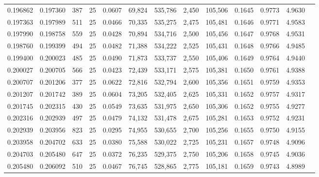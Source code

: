 \begin{tabular}{rrrrrrrrrrrrr}
0.196862 & 0.197360 &   387 &  25 &                                     0.0607 &  69,824 & 535,786 &   2,450 & 105,506 & 0.1645 & 0.9773 & 4.9630 \\
0.197363 & 0.197989 &   511 &  25 &                                     0.0466 &  70,335 & 535,275 &   2,475 & 105,481 & 0.1646 & 0.9771 & 4.9583 \\
0.197990 & 0.198758 &   559 &  25 &                                     0.0428 &  70,894 & 534,716 &   2,500 & 105,456 & 0.1647 & 0.9768 & 4.9531 \\
0.198760 & 0.199399 &   494 &  25 &                                     0.0482 &  71,388 & 534,222 &   2,525 & 105,431 & 0.1648 & 0.9766 & 4.9485 \\
0.199400 & 0.200023 &   485 &  25 &                                     0.0490 &  71,873 & 533,737 &   2,550 & 105,406 & 0.1649 & 0.9764 & 4.9440 \\
0.200027 & 0.200705 &   566 &  25 &                                     0.0423 &  72,439 & 533,171 &   2,575 & 105,381 & 0.1650 & 0.9761 & 4.9388 \\
0.200707 & 0.201206 &   377 &  25 &                                     0.0622 &  72,816 & 532,794 &   2,600 & 105,356 & 0.1651 & 0.9759 & 4.9353 \\
0.201207 & 0.201742 &   389 &  25 &                                     0.0604 &  73,205 & 532,405 &   2,625 & 105,331 & 0.1652 & 0.9757 & 4.9317 \\
0.201745 & 0.202315 &   430 &  25 &                                     0.0549 &  73,635 & 531,975 &   2,650 & 105,306 & 0.1652 & 0.9755 & 4.9277 \\
0.202316 & 0.202939 &   497 &  25 &                                     0.0479 &  74,132 & 531,478 &   2,675 & 105,281 & 0.1653 & 0.9752 & 4.9231 \\
0.202939 & 0.203956 &   823 &  25 &                                     0.0295 &  74,955 & 530,655 &   2,700 & 105,256 & 0.1655 & 0.9750 & 4.9155 \\
0.203958 & 0.204702 &   633 &  25 &                                     0.0380 &  75,588 & 530,022 &   2,725 & 105,231 & 0.1657 & 0.9748 & 4.9096 \\
0.204703 & 0.205480 &   647 &  25 &                                     0.0372 &  76,235 & 529,375 &   2,750 & 105,206 & 0.1658 & 0.9745 & 4.9036 \\
0.205480 & 0.206092 &   510 &  25 &                                     0.0467 &  76,745 & 528,865 &   2,775 & 105,181 & 0.1659 & 0.9743 & 4.8989 \\

\end{tabular}
